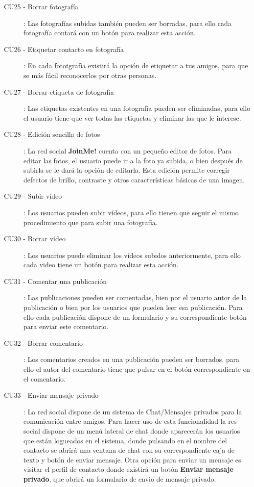 \documentclass[12pt, a4paper, titlepage]{article}
\begin{document}
\begin{description}
	\item [CU25 - Borrar fotografía]: Las fotografías subidas también pueden ser borradas, para ello cada fotografía contará con un botón para realizar esta acción.
	
	\item [CU26 - Etiquetar contacto en fotografía]: En cada fototgrafía existirá la opción de etiquetar a tus amigos, para que se más fácil reconocerlos por otras personas.
	
	\item [CU27 - Borrar etiqueta de fotografía]: Las etiquetas existentes en una fotografía pueden ser eliminadas, para ello el usuario tiene que ver todas las etiquetas y eliminar las que le interese.
	
	\item [CU28 - Edición sencilla de fotos]: La red social \textbf{JoinMe!} cuenta con un pequeño editor de fotos. Para editar las fotos, el usuario puede ir a la foto ya subida, o bien después de subirla se le dará la opción de editarla. Esta edición permite corregir defectos de brillo, contraste y otros características básicas de una imagen.
	
	\item [CU29 - Subir vídeo]: Los usuarios pueden subir vídeos, para ello tienen que seguir el mismo procedimiento que para subir una fotografía.
	
	\item [CU30 - Borrar vídeo]: Los usuarios puede eliminar los vídeos subidos anteriormente, para ello cada video tiene un botón para realizar esta acción.
	
	\item [CU31 - Comentar una publicación]: Las publicaciones pueden ser comentadas, bien por el usuario autor de la publicación o bien por los usuarios que pueden leer esa publicación. Para ello cada publicación dispone de un formulario y su correspondiente botón para enviar este comentario.
	
	\item [CU32 - Borrar comentario]: Los comentarios creados en una publicación pueden ser borrados, para ello el autor del comentario tiene que pulsar en el botón correspondiente en el comentario.
	
	\item [CU33 - Enviar mensaje privado]: La red social dispone de un sistema de Chat/Mensajes privados para la comunicación entre amigos. Para hacer uso de esta funcionalidad la res social dispone de un menú lateral de chat donde aparecerán los usuarios que están logueados en el sistema, donde pulsando en el nombre del contacto se abrirá una ventana de chat con su correspondiente caja de texto y botón de enviar mensaje. Otra opción para enviar un mensaje es visitar el perfil de contacto donde existirá un botón \textbf{Enviar mensaje privado}, que abrirá un formulario de envio de mensaje privado.
	

\end{description}
\end{document}
